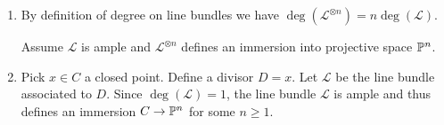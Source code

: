 \newcommand{\sheet}{6}




\maketitle{}

\begin{exercise}{2}
    \begin{enumerate}
        \item{
                By definition of degree on line bundles we have
                $\deg(\mathcal{L}^{\otimes n}) = n \deg(\mathcal{L})$.
                
                Assume $\mathcal{L}$ is ample and $\mathcal{L}^{\otimes n}$
                defines an immersion into projective space $\mathbb{P}^n$.

            }
        \item{
                Pick $x \in C$ a closed point. Define a divisor $D = x$. Let
                $\mathcal{L}$ be the line bundle associated to $D$. Since
                $\deg(\mathcal{L}) = 1$, the line bundle $\mathcal{L}$ is ample
                and thus defines an immersion $C \to \mathbb{P}^n$ for some $n \geq
                1$.
            }
    \end{enumerate}
\end{exercise}



